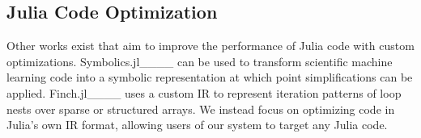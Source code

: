 \subsection{Julia Code Optimization}
Other works exist that aim to improve the performance of Julia code with custom optimizations.
Symbolics.jl____ can be used to transform scientific machine learning code into a symbolic representation at which point simplifications can be applied.
Finch.jl____ uses a custom IR to represent iteration patterns of loop nests over sparse or structured arrays.
We instead focus on optimizing code in Julia's own IR format, allowing users of our system to target any Julia code.

